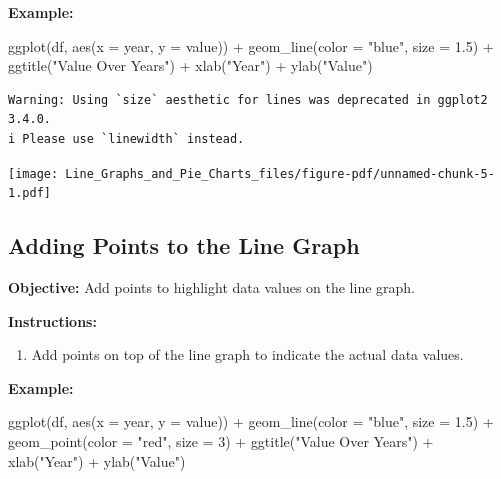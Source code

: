 \documentclass[
  letterpaper,
  DIV=11,
  numbers=noendperiod]{scrreprt}
\newenvironment{Shaded}{\begin{snugshade}}{\end{snugshade}}
\newcommand{\AttributeTok}[1]{\textcolor[rgb]{0.40,0.45,0.13}{#1}}
\newcommand{\DecValTok}[1]{\textcolor[rgb]{0.68,0.00,0.00}{#1}}
\newcommand{\FloatTok}[1]{\textcolor[rgb]{0.68,0.00,0.00}{#1}}
\newcommand{\FunctionTok}[1]{\textcolor[rgb]{0.28,0.35,0.67}{#1}}
\newcommand{\NormalTok}[1]{\textcolor[rgb]{0.00,0.23,0.31}{#1}}
\newcommand{\SpecialCharTok}[1]{\textcolor[rgb]{0.37,0.37,0.37}{#1}}
\newcommand{\StringTok}[1]{\textcolor[rgb]{0.13,0.47,0.30}{#1}}
\providecommand{\tightlist}{%
  \setlength{\itemsep}{0pt}\setlength{\parskip}{0pt}}\usepackage{longtable,booktabs,array}
\begin{document}
\textbf{Example:}

\begin{Shaded}
\begin{Highlighting}[]
\FunctionTok{ggplot}\NormalTok{(df, }\FunctionTok{aes}\NormalTok{(}\AttributeTok{x =}\NormalTok{ year, }\AttributeTok{y =}\NormalTok{ value)) }\SpecialCharTok{+}
  \FunctionTok{geom\_line}\NormalTok{(}\AttributeTok{color =} \StringTok{"blue"}\NormalTok{, }\AttributeTok{size =} \FloatTok{1.5}\NormalTok{) }\SpecialCharTok{+}
  \FunctionTok{ggtitle}\NormalTok{(}\StringTok{"Value Over Years"}\NormalTok{) }\SpecialCharTok{+}
  \FunctionTok{xlab}\NormalTok{(}\StringTok{"Year"}\NormalTok{) }\SpecialCharTok{+}
  \FunctionTok{ylab}\NormalTok{(}\StringTok{"Value"}\NormalTok{)}
\end{Highlighting}
\end{Shaded}

\begin{verbatim}
Warning: Using `size` aesthetic for lines was deprecated in ggplot2 3.4.0.
i Please use `linewidth` instead.
\end{verbatim}

\texttt{[image: Line\_Graphs\_and\_Pie\_Charts\_files/figure-pdf/unnamed-chunk-5-1.pdf]}

\subsection*{Adding Points to the Line
Graph}\label{adding-points-to-the-line-graph}

\textbf{Objective:} Add points to highlight data values on the line
graph.

\textbf{Instructions:}

\begin{enumerate}
\def\labelenumi{\arabic{enumi}.}
\tightlist
\item
  Add points on top of the line graph to indicate the actual data
  values.
\end{enumerate}

\textbf{Example:}

\begin{Shaded}
\begin{Highlighting}[]
\FunctionTok{ggplot}\NormalTok{(df, }\FunctionTok{aes}\NormalTok{(}\AttributeTok{x =}\NormalTok{ year, }\AttributeTok{y =}\NormalTok{ value)) }\SpecialCharTok{+}
  \FunctionTok{geom\_line}\NormalTok{(}\AttributeTok{color =} \StringTok{"blue"}\NormalTok{, }\AttributeTok{size =} \FloatTok{1.5}\NormalTok{) }\SpecialCharTok{+}
  \FunctionTok{geom\_point}\NormalTok{(}\AttributeTok{color =} \StringTok{"red"}\NormalTok{, }\AttributeTok{size =} \DecValTok{3}\NormalTok{) }\SpecialCharTok{+}
  \FunctionTok{ggtitle}\NormalTok{(}\StringTok{"Value Over Years"}\NormalTok{) }\SpecialCharTok{+}
  \FunctionTok{xlab}\NormalTok{(}\StringTok{"Year"}\NormalTok{) }\SpecialCharTok{+}
  \FunctionTok{ylab}\NormalTok{(}\StringTok{"Value"}\NormalTok{)}
\end{Highlighting}
\end{Shaded}
\end{document}
